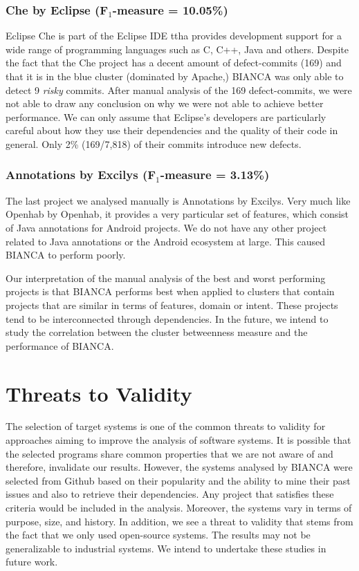 \documentclass[conference]{IEEEtran}
\begin{document}
\subsubsection{Che by Eclipse (F$_1$-measure =
10.05\%)}\label{che-by-eclipse-fux5f1-measure-10.05}

Eclipse Che is part of the Eclipse IDE ttha provides development support
for a wide range of programming languages such as C, C++, Java and
others. Despite the fact that the Che project has a decent amount of
defect-commits (169) and that it is in the blue cluster (dominated by
Apache,) BIANCA was only able to detect 9 \emph{risky} commits. After
manual analysis of the 169 defect-commits, we were not able to draw any
conclusion on why we were not able to achieve better performance. We can
only assume that Eclipse's developers are particularly careful about how
they use their dependencies and the quality of their code in general.
Only 2\% (169/7,818) of their commits introduce new defects.

\subsubsection{Annotations by Excilys (F$_1$-measure =
3.13\%)}\label{annotations-by-excilys-fux5f1-measure-3.13}

The last project we analysed manually is Annotations by Excilys. Very
much like Openhab by Openhab, it provides a very particular set of
features, which consist of Java annotations for Android projects. We do
not have any other project related to Java annotations or the Android
ecosystem at large. This caused BIANCA to perform poorly.

Our interpretation of the manual analysis of the best and worst
performing projects is that BIANCA performs best when applied to
clusters that contain projects that are similar in terms of features,
domain or intent. These projects tend to be interconnected through
dependencies. In the future, we intend to study the correlation between
the cluster betweenness measure and the performance of BIANCA.

\section{Threats to Validity}\label{sec:threats}

The selection of target systems is one of the common threats to validity
for approaches aiming to improve the analysis of software systems. It is
possible that the selected programs share common properties that we are
not aware of and therefore, invalidate our results. However, the systems
analysed by BIANCA were selected from Github based on their popularity
and the ability to mine their past issues and also to retrieve their
dependencies. Any project that satisfies these criteria would be
included in the analysis. Moreover, the systems vary in terms of
purpose, size, and history. In addition, we see a threat to validity
that stems from the fact that we only used open-source systems. The
results may not be generalizable to industrial systems. We intend to
undertake these studies in future work.
\end{document}

